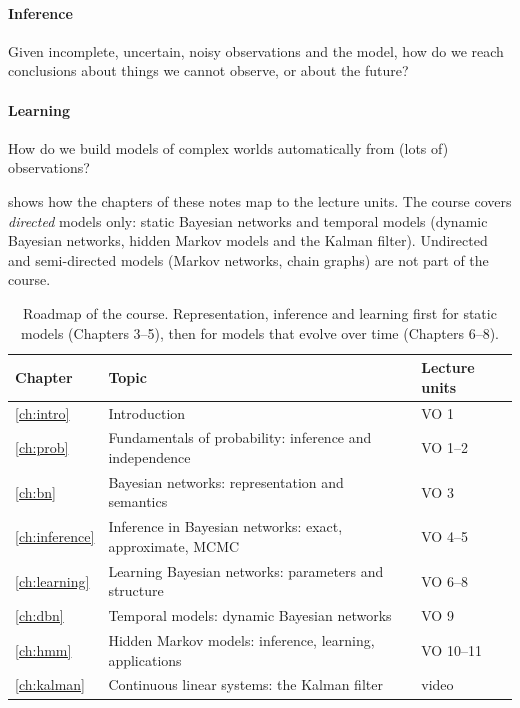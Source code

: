 \documentclass[11pt, oneside]{book}
\begin{document}
\paragraph{Inference} Given incomplete, uncertain, noisy observations and the
model, how do we reach conclusions about things we cannot observe, or about the
future?

\paragraph{Learning} How do we build models of complex worlds automatically
from (lots of) observations?

 shows how the chapters of these notes map to the lecture
units. The course covers \emph{directed} models only: static Bayesian networks
and temporal models (dynamic Bayesian networks, hidden Markov models and the
Kalman filter). Undirected and semi-directed models (Markov networks, chain
graphs) are not part of the course.

\begin{table}[htbp]
\centering
\small
\begin{tabular}{@{}lll@{}}
\toprule
\textbf{Chapter} & \textbf{Topic} & \textbf{Lecture units} \\
\midrule
\ref{ch:intro} & Introduction & VO 1 \\
\ref{ch:prob}  & Fundamentals of probability: inference and independence & VO 1--2 \\
\ref{ch:bn}    & Bayesian networks: representation and semantics & VO 3 \\
\ref{ch:inference} & Inference in Bayesian networks: exact, approximate, MCMC & VO 4--5 \\
\ref{ch:learning}  & Learning Bayesian networks: parameters and structure & VO 6--8 \\
\ref{ch:dbn}   & Temporal models: dynamic Bayesian networks & VO 9 \\
\ref{ch:hmm}   & Hidden Markov models: inference, learning, applications & VO 10--11 \\
\ref{ch:kalman} & Continuous linear systems: the Kalman filter & video \\
\bottomrule
\end{tabular}
\caption{Roadmap of the course. Representation, inference and learning first
for static models (Chapters 3--5), then for models that evolve over time
(Chapters 6--8).}
\label{tab:roadmap}
\end{table}
\end{document}

